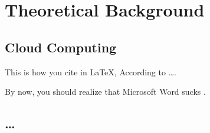 \chapter{Theoretical Background}

\blindtext

\section{Cloud Computing}

	This is how you cite in \LaTeX, 
	According to \citet{pso:rapso:rada-vilela11}\ldots.
	
	By now, you should realize that Microsoft Word sucks
	\citep{pso:spso-apso:rada-vilela11}.
	
	

\section{\ldots}

\blindtext